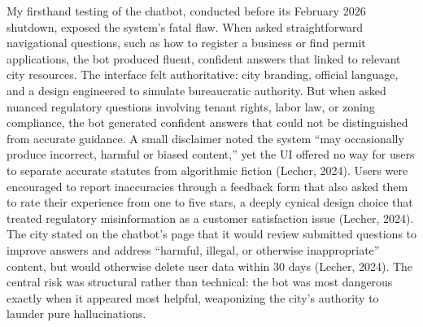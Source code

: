 \documentclass[10pt, twocolumn]{article}
\begin{document}
My firsthand testing of the chatbot, conducted before its February 2026 shutdown, exposed the system's fatal flaw. When asked straightforward navigational questions, such as how to register a business or find permit applications, the bot produced fluent, confident answers that linked to relevant city resources. The interface felt authoritative: city branding, official language, and a design engineered to simulate bureaucratic authority. But when asked nuanced regulatory questions involving tenant rights, labor law, or zoning compliance, the bot generated confident answers that could not be distinguished from accurate guidance. A small disclaimer noted the system ``may occasionally produce incorrect, harmful or biased content,'' yet the UI offered no way for users to separate accurate statutes from algorithmic fiction (Lecher, 2024). Users were encouraged to report inaccuracies through a feedback form that also asked them to rate their experience from one to five stars, a deeply cynical design choice that treated regulatory misinformation as a customer satisfaction issue (Lecher, 2024). The city stated on the chatbot's page that it would review submitted questions to improve answers and address ``harmful, illegal, or otherwise inappropriate'' content, but would otherwise delete user data within 30 days (Lecher, 2024). The central risk was structural rather than technical: the bot was most dangerous exactly when it appeared most helpful, weaponizing the city's authority to launder pure hallucinations.
\end{document}
